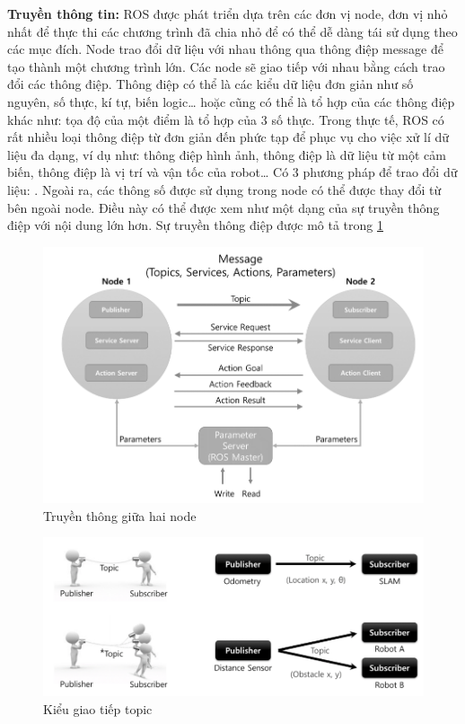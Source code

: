 \textbf{Truyền thông tin: } ROS được phát triển dựa trên các đơn vị node, đơn vị nhỏ nhất để thực thi các chương trình đã chia nhỏ để có thể dễ dàng tái sử dụng theo các mục đích. Node trao đổi dữ liệu với nhau thông qua thông điệp message để tạo thành một chương trình lớn. Các node sẽ giao tiếp với nhau bằng cách trao đổi các thông điệp. Thông điệp có thể là các kiểu dữ liệu đơn giản như số nguyên, số thực, kí tự, biến logic… hoặc cũng có thể là tổ hợp của các thông điệp khác như: tọa độ của một điểm là tổ hợp của 3 số thực. Trong thực tế, ROS có rất nhiều loại thông điệp từ đơn giản đến phức tạp để phục vụ cho việc xử lí dữ liệu đa dạng, ví dụ như: thông điệp hình ảnh, thông điệp là dữ liệu từ một cảm biến, thông điệp là vị trí và vận tốc của robot…
Có 3 phương pháp để trao đổi dữ liệu: . Ngoài ra, các thông số được sử dụng trong node có thể được thay đổi từ bên ngoài node. Điều này có thể được xem như một dạng của sự truyền thông điệp với nội dung lớn hơn. Sự truyền thông điệp được mô tả trong \figurename{\ref{fig:messageCommunication}}

\begin{figure}[htbp]
  \centering
  \includegraphics[width=0.8\linewidth]{figures/messageCommunication.png}
  \caption{Truyền thông giữa hai node}
  \label{fig:messageCommunication}
\end{figure}

\begin{figure}[htbp]
  \centering
  \includegraphics[width=0.9\linewidth]{figures/topic.png}
  \caption{Kiểu giao tiếp topic}
  \label{fig:topic}
\end{figure}

